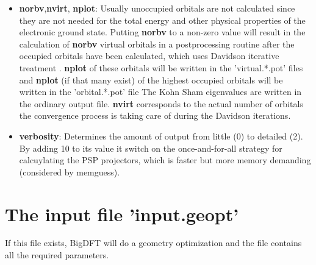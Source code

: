 \documentclass[a4paper,11pt]{report}
\begin{document}
\begin{itemize}
\item {\bf norbv},{\bf nvirt}, {\bf  nplot}: Usually unoccupied orbitals are not calculated since they are not needed for 
                                 the total energy and other physical properties of the electronic ground state. 
                                 Putting  {\bf norbv} to  a non-zero 
                                 value will result in the calculation of {\bf norbv} virtual orbitals in a postprocessing 
                                 routine after the occupied orbitals have been calculated, which uses Davidson iterative treatment . {\bf nplot}  of these 
                                 orbitals will be written in the 'virtual.*.pot' files and {\bf nplot} (if that many exist) 
                                 of the highest occupied orbitals will be  written in the 'orbital.*.pot' file
                                 The Kohn Sham eigenvalues are written in the ordinary output file.  {\bf nvirt} corresponds to the actual number of orbitals the convergence process is taking care of during the Davidson iterations.

\item {\bf verbosity}: Determines the amount of output from little (0) to detailed (2). By adding 10 to its value it switch on the once-and-for-all strategy for calcuylating the PSP projectors, which is faster but more memory demanding (considered by memguess).
\end{itemize}

\section{The input file 'input.geopt'}
If this file exists, BigDFT will do a geometry optimization and the file contains all the required parameters.
\end{document}
